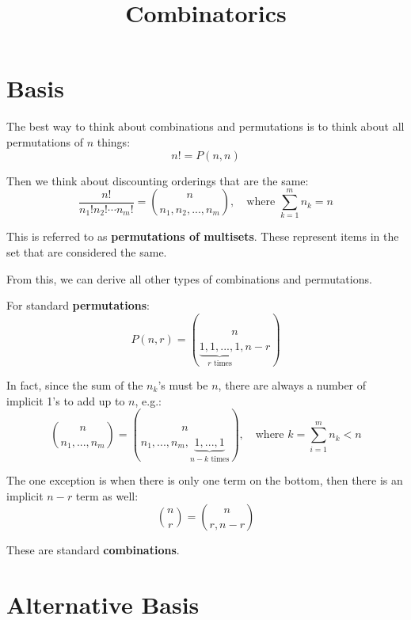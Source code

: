 \documentclass{article}
\title{Combinatorics}
\begin{document}
    \maketitle

    \tableofcontents

    \section{Basis}

    The best way to think about combinations and permutations is to think about all permutations of $n$ things: \begin{equation}
        n! = P(n, n)
    \end{equation}

    Then we think about discounting orderings that are the same: \begin{equation}
        \frac{n!}{n_1! n_2! \cdots n_m!} = {n \choose n_1, n_2, ..., n_m}, \quad \text{where } \sum_{k = 1}^m{n_k} = n
    \end{equation}

    This is referred to as \textbf{permutations of multisets}. These represent items in the set that are considered the same.

    From this, we can derive all other types of combinations and permutations.

    For standard \textbf{permutations}: \begin{equation}
        P(n, r) = {n \choose \underbrace{1, 1, ..., 1}_{r \text{ times}}, n - r}
    \end{equation}

    In fact, since the sum of the $n_k$'s must be $n$, there are always a number of implicit 1's to add up to $n$, e.g.: \begin{equation}
        {n \choose n_1, ..., n_m} = {n \choose n_1, ..., n_m, \underbrace{1, ..., 1}_{n - k \text{ times}}}, \quad \text{where } k = \sum_{i = 1}^m{n_k} < n
    \end{equation}

    The one exception is when there is only one term on the bottom, then there is an implicit $n - r$ term as well: \begin{equation}
        {n \choose r} = {n \choose r, n - r}
    \end{equation}

    These are standard \textbf{combinations}.
    
    \section{Alternative Basis}
\end{document}
